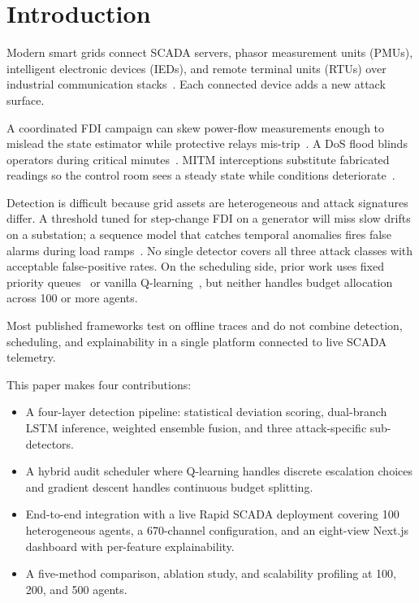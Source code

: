 \documentclass[conference,a4paper]{IEEEtran}
\begin{document}
\section{Introduction}

Modern smart grids connect SCADA servers, phasor measurement units (PMUs), intelligent electronic devices (IEDs), and remote terminal units (RTUs) over industrial communication stacks~\cite{b1}. Each connected device adds a new attack surface.

A coordinated FDI campaign can skew power-flow measurements enough to mislead the state estimator while protective relays mis-trip~\cite{b2}. A DoS flood blinds operators during critical minutes~\cite{b3}. MITM interceptions substitute fabricated readings so the control room sees a steady state while conditions deteriorate~\cite{b4}.

Detection is difficult because grid assets are heterogeneous and attack signatures differ. A threshold tuned for step-change FDI on a generator will miss slow drifts on a substation; a sequence model that catches temporal anomalies fires false alarms during load ramps~\cite{b5}. No single detector covers all three attack classes with acceptable false-positive rates. On the scheduling side, prior work uses fixed priority queues~\cite{b6} or vanilla Q-learning~\cite{b7}, but neither handles budget allocation across 100 or more agents.

Most published frameworks test on offline traces and do not combine detection, scheduling, and explainability in a single platform connected to live SCADA telemetry.

This paper makes four contributions:
\begin{itemize}
\item A four-layer detection pipeline: statistical deviation scoring, dual-branch LSTM inference, weighted ensemble fusion, and three attack-specific sub-detectors.
\item A hybrid audit scheduler where Q-learning handles discrete escalation choices and gradient descent handles continuous budget splitting.
\item End-to-end integration with a live Rapid SCADA deployment covering 100 heterogeneous agents, a 670-channel configuration, and an eight-view Next.js dashboard with per-feature explainability.
\item A five-method comparison, ablation study, and scalability profiling at 100, 200, and 500 agents.
\end{itemize}
\end{document}
